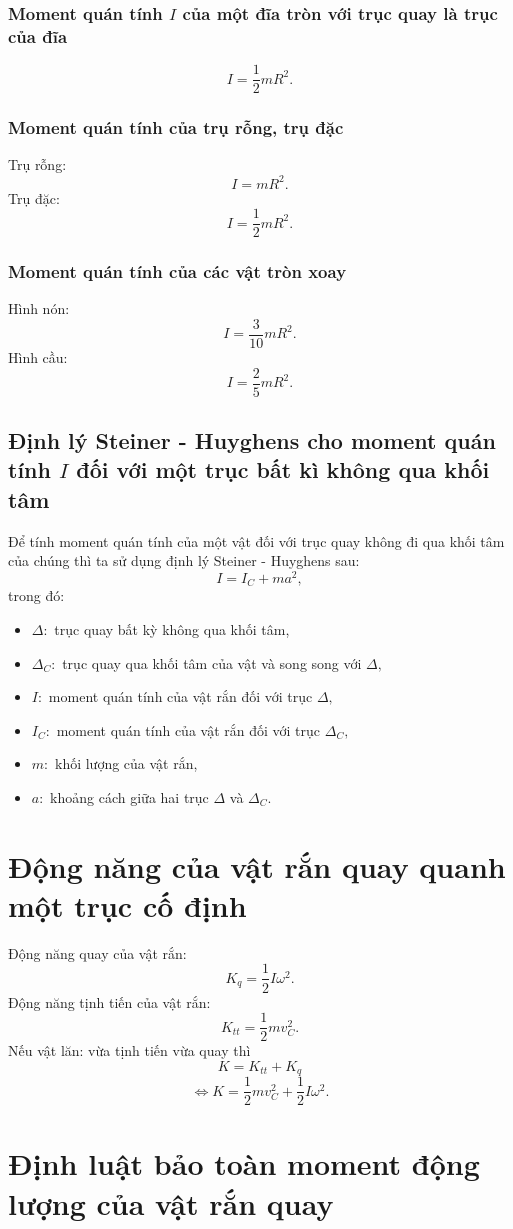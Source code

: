 \subsubsection{Moment quán tính $I$ của một đĩa tròn với trục quay là trục của đĩa}
$$I = \frac{1}{2}mR^2.$$
\subsubsection{Moment quán tính của trụ rỗng, trụ đặc}
Trụ rỗng:
$$I = mR^2.$$
Trụ đặc:
$$I = \frac{1}{2}mR^2.$$
\subsubsection{Moment quán tính của các vật tròn xoay}
Hình nón:
$$I = \frac{3}{10}mR^2.$$
Hình cầu:
$$I = \frac{2}{5}mR^2.$$
\subsection{Định lý Steiner - Huyghens cho moment quán tính $I$ đối với một trục bất kì không qua khối tâm}
Để tính moment quán tính của một vật đối với trục quay không đi qua khối tâm của chúng thì ta sử dụng định lý Steiner - Huyghens sau:
$$I = I_C +ma^2,$$
trong đó:
\begin{itemize}
\item $\Delta:$ trục quay bất kỳ không qua khối tâm,
\item $\Delta_C:$ trục quay qua khối tâm của vật và song song với $\Delta,$
\item $I:$ moment quán tính của vật rắn đối với trục $\Delta,$
\item $I_C:$ moment quán tính của vật rắn đối với trục $\Delta_C,$
\item $m:$ khối lượng của vật rắn,
\item $a:$ khoảng cách giữa hai trục $\Delta$ và $\Delta_C.$
\end{itemize}
\section{Động năng của vật rắn quay quanh một trục cố định}
Động năng quay của vật rắn:
$$K_q = \frac{1}{2}I \omega^2.$$
Động năng tịnh tiến của vật rắn:
$$K_{tt} = \frac{1}{2}mv_C^2.$$
Nếu vật lăn: vừa tịnh tiến vừa quay thì
$$K = K_{tt} + K_{q}$$
$$\Leftrightarrow K = \frac{1}{2}mv_C^2 + \frac{1}{2}I \omega^2.$$
\section{Định luật bảo toàn moment động lượng của vật rắn quay}
